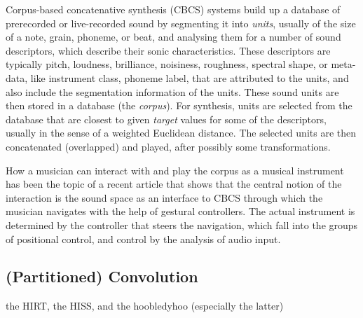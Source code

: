 Corpus-based concatenative synthesis (CBCS) \cite{Schwarz-ieeespm2007-concat} systems build up a database of prerecorded or live-recorded sound by segmenting it into
\textit{units}, usually of the size of a note, grain, phoneme, or beat, and analysing them for a
number of sound descriptors, which describe their sonic characteristics.
These descriptors are typically pitch, loudness, brilliance, noisiness, roughness, spectral shape, or meta-data, like instrument class, phoneme label, that are attributed to the units,
and also include the segmentation information of the units.
These sound units are then stored in a database (the \textit{corpus}).  For synthesis, units are
selected from the database that are closest to given \textit{target} values for some of the
descriptors, usually in the sense of a weighted Euclidean distance.
The selected units are then concatenated (overlapped) and played, after possibly some transformations.


How a musician can interact with and play the corpus as a musical instrument has been the topic of a recent article \cite{Schwarz-nime2012-sound-space} that shows that the central notion of the interaction is the sound space as an interface to CBCS through which the musician navigates with the help of gestural controllers.  
The actual instrument is determined by the controller that steers the
navigation, which fall into the groups of positional control, and control by the analysis of audio
input.


\subsection{(Partitioned) Convolution}


the HIRT, the HISS, and the hoobledyhoo (especially the latter)
